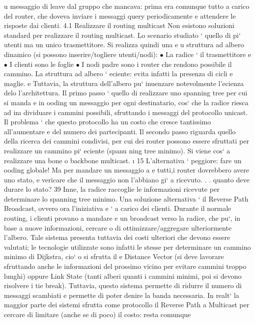 \documentclass[a4paper,12pt]{article}
\begin{document}
u
messaggio di leave dal gruppo che mancava: prima era comunque tutto a carico
del router, che doveva inviare i messaggi query periodicamente e attendere le
risposte dai clienti.
4.1
Realizzare il routing multicast
Non esistono soluzioni standard per realizzare il routing multicast. Lo scenario
studiato ` quello di pi` utenti ma un unico trasmettitore. Si realizza quindi una
e
u
struttura ad albero dinamico (si possono inserire/togliere utenti/nodi):
$\bullet$ La radice ` il trasmettitore
e
$\bullet$ I clienti sono le foglie
$\bullet$ I nodi padre sono i router che rendono possibile il cammino.
La struttura ad albero ` eciente: evita infatti la presenza di cicli e maglie.
e
Tuttavia, la struttura dell'albero pu` inuenzare notevolmente l'ecienza delo
l'architettura.
Il primo passo ` quello di realizzare uno spanning tree per cui si manda
e
in ooding un messaggio per ogni destinatario, cos` che la radice riesca ad in\i{}
dividuare i cammini possibili, sfruttando i messaggi del protocollo unicast. Il
problema ` che questo protocollo ha un costo che cresce tantissimo all'aumentare
e
del numero dei partecipanti.
Il secondo passo riguarda quello della ricerca dei cammini condivisi, per cui
dei router possono essere sfruttati per realizzare un cammino pi` eciente (spanu
ning tree minimo). Si viene cos` a realizzare una bone o backbone multicast.
\i{}
15 L'alternativa ` peggiore: fare un ooding globale! Ma per mandare un messaggio a
e
tutti,i router dovrebbero avere uno stato, e vericare che il messaggio non l'abbiano gi`
a
ricevuto. . . quanto deve durare lo stato?
39
Inne, la radice raccoglie le informazioni ricevute per determinare lo spanning
tree minimo.
Una soluzione alternativa ` il Reverse Path Broadcast, ovvero ora l'iniziativa
e
` a carico dei clienti. Durante il normale routing, i clienti provano a mandare
e
un broadcast verso la radice, che pu`, in base a nuove informazioni, cercare
o
di ottimizzare/aggregare ulteriormente l'albero. Tale sistema presenta tuttavia
dei costi ulteriori che devono essere valutati; le tecnologie utilizzate sono infatti
le stesse per determinare un cammino minimo di Dijkstra, cio` o si sfrutta il
e
Distance Vector (si deve lavorare sfruttando anche le informazioni del prossimo
vicino per evitare cammini troppo lunghi) oppure Link State (tanti alberi quanti
i cammini minimi, poi si devono risolvere i tie break). Tuttavia, questo sistema
permette di ridurre il numero di messaggi scambiati e permette di poter denire
la banda necessaria.
In realt` la maggior parte dei sistemi sfrutta come protocollo il Reverse Path
a
Multicast per cercare di limitare (anche se di poco) il costo: resta comunque
\end{document}
